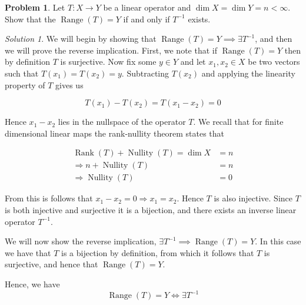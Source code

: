 \documentclass[12pt,a4paper]{article}
\theoremstyle{definition}
\newtheorem{problem}{Problem}
\theoremstyle{remark}
\newtheorem*{solution}{Solution}
\begin{document}
\begin{problem}
    Let $T:X\rightarrow Y$ be a linear operator and $\dim X=\dim Y=n < \infty$. Show that the $\operatorname{Range}(T)=Y$ if and only if $T^{-1}$ exists.
\end{problem}
\begin{solution}
    We will begin by showing that $\operatorname{Range}(T)=Y \implies \exists T^{-1}$, and then we will prove the reverse implication. First, we note that if $\operatorname{Range}(T)=Y$ then by definition $T$ is surjective. Now fix some $y \in Y$ and let $x_1, x_2 \in X$ be two vectors such that $T(x_1)=T(x_2)=y$. Subtracting $T(x_2)$ and applying the linearity property of $T$ gives us 

    $$T(x_1) - T(x_2) = T(x_1-x_2)=0$$

    Hence $x_1-x_2$ lies in the nullspace of the operator $T$. We recall that for finite dimensional linear maps the rank-nullity theorem states that 

    \begin{align*}
        \operatorname{Rank}(T) + \operatorname{Nullity}(T) = \dim X &= n \\
        \Rightarrow n + \operatorname{Nullity}(T) &= n \\
        \Rightarrow \operatorname{Nullity}(T) &= 0
    \end{align*}

    From this is follows that $x_1-x_2=0 \Rightarrow x_1=x_2$. Hence $T$ is also injective. Since $T$ is both injective and surjective it is a bijection, and there exists an inverse linear operator $T^{-1}$. 
    
    We will now show the reverse implication, $\exists T^{-1} \implies \operatorname{Range}(T) = Y$. In this case we have that $T$ is a bijection by definition, from which it follows that $T$ is surjective, and hence that $\operatorname{Range}(T) =Y$. 

    Hence, we have $$\operatorname{Range}(T) = Y \Leftrightarrow \exists T^{-1}$$
\end{solution}
\end{document}

